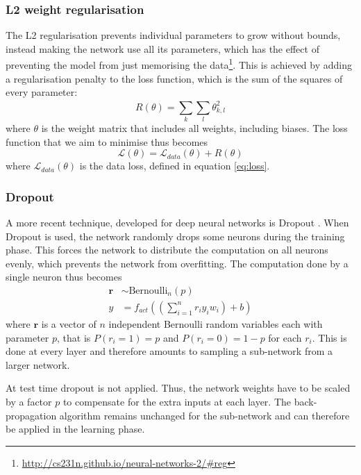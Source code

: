 \documentclass[12pt,a4paper,twoside,openright]{report}
\begin{document}
\subsubsection{\textbf{L2} weight regularisation}
The L2 regularisation prevents individual parameters to grow without bounds, instead making the network use all its parameters, which has the effect of preventing the model from just memorising the data\footnote{\url{http://cs231n.github.io/neural-networks-2/\#reg}}. This is achieved by adding a regularisation penalty to the loss function, which is the sum of the squares of every parameter:
\begin{equation}
	R(\theta) = \sum_{k}^{} \sum_{l}^{} \theta_{k,l}^2
\end{equation} 
where $\theta$ is the weight matrix that includes all weights, including biases.
The loss function that we aim to minimise thus becomes
\begin{equation}
	\mathcal{L}(\theta) = \mathcal{L}_{data}(\theta) + R(\theta) 
\end{equation}
where $\mathcal{L}_{data}(\theta)$ is the data loss, defined in equation \ref{eq:loss}. 

\subsubsection{Dropout}
A more recent technique, developed for deep neural networks is Dropout \cite{dropout}. When Dropout is used, the network randomly drops some neurons during the training phase. This forces the network to distribute the computation on all neurons evenly, which prevents the network from overfitting. The computation done by a single neuron thus becomes
\begin{equation}
\begin{split}
	\textbf{r} & \sim \text{Bernoulli}_n(p) \\
	y & = f_{act}((\sum_{i=1}^{n} r_i y_i w_i) + b)
\end{split}
\end{equation}
where $\textbf{r}$ is a vector of $n$ independent Bernoulli random variables each with parameter $p$, that is $P(r_i = 1) = p$ and $P(r_i = 0) = 1 - p$ for each $r_i$. This is done at every layer and therefore amounts to sampling a sub-network from a larger network. 

At test time dropout is not applied. Thus, the network weights have to be scaled by a factor $p$ to compensate for the extra inputs at each layer. The back-propagation algorithm remains unchanged for the sub-network and can therefore be applied in the learning phase.
\end{document}
